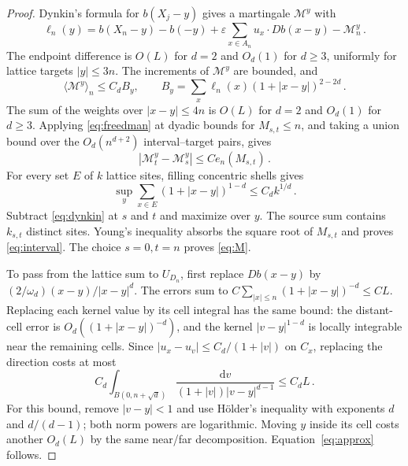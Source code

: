 \documentclass[11pt]{amsart}
\theoremstyle{plain}
\theoremstyle{definition}
\newcommand{\eps}{\varepsilon}
\newcommand{\dd}{\mathrm d}
\begin{document}
\begin{proof}
Dynkin's formula for $b(X_j-y)$ gives a martingale $\mathcal M^y$ with
\begin{equation}\label{eq:dynkin}
\ell_n(y)=b(X_n-y)-b(-y)
+\eps\sum_{x\in A_n}u_x\cdot Db(x-y)-\mathcal M_n^y\, .
\end{equation}
The endpoint difference is $O(L)$ for $d=2$ and $O_d(1)$ for $d\geq3$,
uniformly for lattice targets $|y|\leq3n$.
The increments of $\mathcal M^y$ are bounded, and
\begin{equation}\label{eq:bracket}
\langle\mathcal M^y\rangle_n\leq C_d B_y ,\qquad
B_y=\sum_x\ell_n(x)(1+|x-y|)^{2-2d}\, .
\end{equation}
The sum of the weights over $|x-y|\leq4n$ is $O(L)$ for $d=2$
and $O_d(1)$ for $d\geq3$. Applying \eqref{eq:freedman} at dyadic
bounds for $M_{s,t}\leq n$, and taking a union bound over the
$O_d(n^{d+2})$ interval--target pairs, gives
\begin{equation}\label{eq:interval-mart}
|\mathcal M_t^y-\mathcal M_s^y|\leq C e_n(M_{s,t})\, .
\end{equation}
For every set $E$ of $k$ lattice sites, filling concentric shells gives
\begin{equation}\label{eq:packing-lattice}
\sup_y\sum_{x\in E}(1+|x-y|)^{1-d}\leq C_d k^{1/d}\, .
\end{equation}
Subtract \eqref{eq:dynkin} at $s$ and $t$ and maximize over $y$.
The source sum contains $k_{s,t}$ distinct sites. Young's inequality
absorbs the square root of $M_{s,t}$ and proves \eqref{eq:interval}.
The choice $s=0,t=n$ proves \eqref{eq:M}.

To pass from the lattice sum to $U_{D_n}$, first replace $Db(x-y)$
by $(2/\omega_d)(x-y)/|x-y|^d$. The errors sum to
$C\sum_{|x|\leq n}(1+|x-y|)^{-d}\leq CL$.
Replacing each kernel value by its cell integral has the same bound:
the distant-cell error is $O_d((1+|x-y|)^{-d})$, and the kernel
$|v-y|^{1-d}$ is locally integrable near the remaining cells.
Since $|u_x-u_v|\leq C_d/(1+|v|)$ on $C_x$, replacing the direction
costs at most
\begin{equation}\label{eq:direction-error}
C_d\int_{B(0,n+\sqrt d)}
\frac{\dd v}{(1+|v|)|v-y|^{d-1}}\leq C_dL\, .
\end{equation}
For this bound, remove $|v-y|<1$ and use H\"older's inequality with
exponents $d$ and $d/(d-1)$; both norm powers are logarithmic.
Moving $y$ inside its cell costs another $O_d(L)$ by the same
near/far decomposition. Equation~\eqref{eq:approx} follows.
\end{proof}
\end{document}

